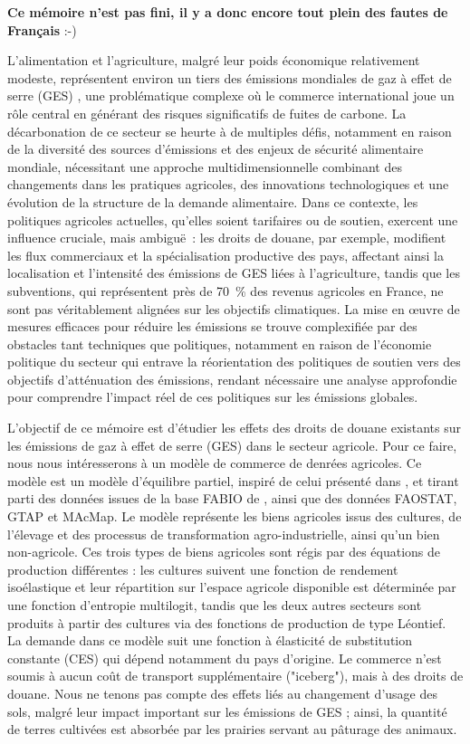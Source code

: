 \textbf{Ce mémoire n'est pas fini, il y a donc encore tout plein des fautes de Français} :-)

L'alimentation et l'agriculture, malgré leur poids économique relativement modeste, représentent environ un tiers des émissions mondiales de gaz à effet de serre (GES) \cite{Crippa2021}, une problématique complexe où le commerce international joue un rôle central en générant des risques significatifs de fuites de carbone. La décarbonation de ce secteur se heurte à de multiples défis, notamment en raison de la diversité des sources d'émissions et des enjeux de sécurité alimentaire mondiale, nécessitant une approche multidimensionnelle combinant des changements dans les pratiques agricoles, des innovations technologiques et une évolution de la structure de la demande alimentaire. Dans ce contexte, les politiques agricoles actuelles, qu'elles soient tarifaires ou de soutien, exercent une influence cruciale, mais ambiguë~: les droits de douane, par exemple, modifient les flux commerciaux et la spécialisation productive des pays, affectant ainsi la localisation et l'intensité des émissions de GES liées à l'agriculture, tandis que les subventions, qui représentent près de 70~\% des revenus agricoles en France, ne sont pas véritablement alignées sur les objectifs climatiques. La mise en œuvre de mesures efficaces pour réduire les émissions se trouve complexifiée par des obstacles tant techniques que politiques, notamment en raison de l'économie politique du secteur qui entrave la réorientation des politiques de soutien vers des objectifs d'atténuation des émissions, rendant nécessaire une analyse approfondie pour comprendre l'impact réel de ces politiques sur les émissions globales.

L'objectif de ce mémoire est d'étudier les effets des droits de douane existants sur les émissions de gaz à effet de serre (GES) dans le secteur agricole. Pour ce faire, nous nous intéresserons à un modèle de commerce de denrées agricoles. Ce modèle est un modèle d'équilibre partiel, inspiré de celui présenté dans \cite{Gouel2021}, et tirant parti des données issues de la base FABIO de \cite{Bruckner2019}, ainsi que des données FAOSTAT, GTAP et MAcMap. Le modèle représente les biens agricoles issus des cultures, de l'élevage et des processus de transformation agro-industrielle, ainsi qu'un bien non-agricole. Ces trois types de biens agricoles sont régis par des équations de production différentes : les cultures suivent une fonction de rendement isoélastique et leur répartition sur l'espace agricole disponible est déterminée par une fonction d'entropie multilogit, tandis que les deux autres secteurs sont produits à partir des cultures via des fonctions de production de type Léontief. La demande dans ce modèle suit une fonction à élasticité de substitution constante (CES) qui dépend notamment du pays d'origine. Le commerce n'est soumis à aucun coût de transport supplémentaire ("iceberg"), mais à des droits de douane. Nous ne tenons pas compte des effets liés au changement d'usage des sols, malgré leur impact important sur les émissions de GES ; ainsi, la quantité de terres cultivées est absorbée par les prairies servant au pâturage des animaux.

